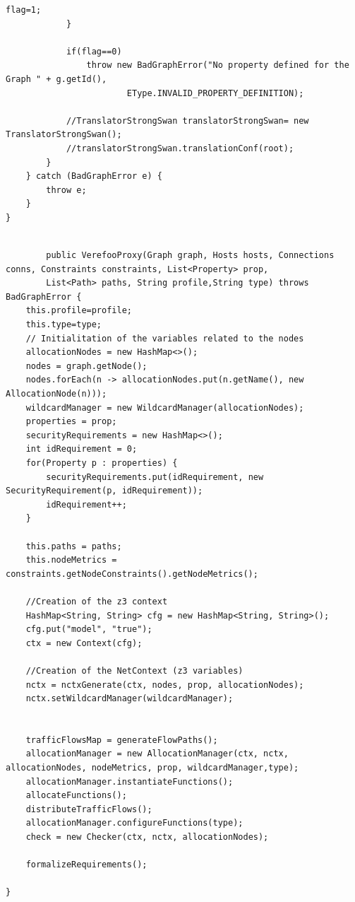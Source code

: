 \begin{lstlisting}[caption={Esempio di codice Java}, label=lst:java_example]
                flag=1;
            }

            if(flag==0)
                throw new BadGraphError("No property defined for the Graph " + g.getId(),
                        EType.INVALID_PROPERTY_DEFINITION);

            //TranslatorStrongSwan translatorStrongSwan= new TranslatorStrongSwan();
            //translatorStrongSwan.translationConf(root);
        }
    } catch (BadGraphError e) {
        throw e;
    }
}

    \end{lstlisting}
    
\newpage
    \begin{lstlisting}[caption={Esempio di codice Java}, label=lst:java_example]
 
        public VerefooProxy(Graph graph, Hosts hosts, Connections conns, Constraints constraints, List<Property> prop,
        List<Path> paths, String profile,String type) throws BadGraphError {
    this.profile=profile;
    this.type=type;
    // Initialitation of the variables related to the nodes
    allocationNodes = new HashMap<>();
    nodes = graph.getNode();
    nodes.forEach(n -> allocationNodes.put(n.getName(), new AllocationNode(n)));
    wildcardManager = new WildcardManager(allocationNodes);
    properties = prop;
    securityRequirements = new HashMap<>();
    int idRequirement = 0;
    for(Property p : properties) {
        securityRequirements.put(idRequirement, new SecurityRequirement(p, idRequirement));
        idRequirement++;
    }
    
    this.paths = paths;
    this.nodeMetrics = constraints.getNodeConstraints().getNodeMetrics();
    
    //Creation of the z3 context
    HashMap<String, String> cfg = new HashMap<String, String>();
    cfg.put("model", "true");
    ctx = new Context(cfg);
            
    //Creation of the NetContext (z3 variables)
    nctx = nctxGenerate(ctx, nodes, prop, allocationNodes);
    nctx.setWildcardManager(wildcardManager);


    trafficFlowsMap = generateFlowPaths();
    allocationManager = new AllocationManager(ctx, nctx, allocationNodes, nodeMetrics, prop, wildcardManager,type);
    allocationManager.instantiateFunctions();
    allocateFunctions();
    distributeTrafficFlows();
    allocationManager.configureFunctions(type);
    check = new Checker(ctx, nctx, allocationNodes);

    formalizeRequirements();
    
}
    \end{lstlisting}



